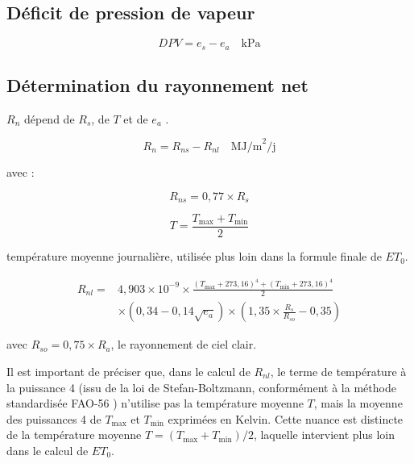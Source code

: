 \subsection{Déficit de pression de vapeur}

\begin{equation}
    DPV = e_s - e_a \quad \text{kPa}
    \label{eq:dpv}
\end{equation}

\subsection{Détermination du rayonnement net}

$R_n$ dépend de $R_s$, de $T$ et de $e_a$ \cite{koc_reference_2023}.

\begin{equation}
    R_n = R_{ns} - R_{nl} \quad \text{MJ/m}^2\text{/j}
    \label{eq:rn}
\end{equation}

\noindent avec :

\begin{equation}
    R_{ns} = 0{,}77 \times R_s
    \label{eq:rns}
\end{equation}

\begin{equation}
    T = \frac{T_{\max} + T_{\min}}{2}
    \label{eq:t_moy}
\end{equation}

\noindent température moyenne journalière, utilisée plus loin dans la formule finale de $ET_0$.

\begin{equation}
    \begin{split}
        R_{nl} ={}& 4{,}903 \times 10^{-9} \times \frac{(T_{\max} + 273{,}16)^4 + (T_{\min} + 273{,}16)^4}{2} \\
        & \times \left(0{,}34 - 0{,}14\sqrt{e_a}\right) \times \left(1{,}35 \times \frac{R_s}{R_{so}} - 0{,}35\right)
    \end{split}
    \label{eq:rnl}
\end{equation}

\noindent avec $R_{so} = 0{,}75 \times R_a$, le rayonnement de ciel clair.

Il est important de préciser que, dans le calcul de $R_{nl}$, le terme de température à la puissance 4 (issu de la loi de Stefan-Boltzmann, conformément à la méthode standardisée FAO-56 \cite[chap.~3]{allen_crop_1998-1}) n'utilise pas la température moyenne $T$, mais la moyenne des puissances 4 de $T_{\max}$ et $T_{\min}$ exprimées en Kelvin. Cette nuance est distincte de la température moyenne $T = (T_{\max} + T_{\min})/2$, laquelle intervient plus loin dans le calcul de $ET_0$.

